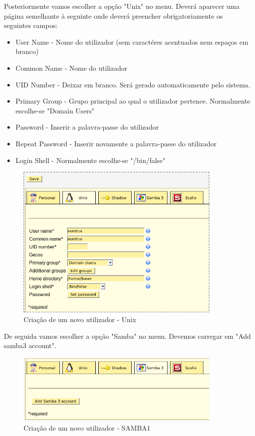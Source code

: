 Posteriormente vamos escolher a opção "Unix" no menu. Deverá aparecer uma página semelhante à seguinte onde deverá preencher obrigatoriamente os seguintes campos:

\begin{itemize}
\item User Name - Nome do utilizador (sem caractéres acentuados nem espaços em branco)
\item Common Name - Nome do utilizador
\item UID Number - Deixar em branco. Será gerado automaticamente pelo sistema.
\item Primary Group - Grupo principal ao qual o utilizador pertence. Normalmente escolhe-se "Domain Users"
\item Password - Inserir a palavra-passe do utilizador
\item Repeat Password - Inserir novamente a palavra-passe do utilizador
\item Login Shell - Normalmente escolhe-se "/bin/false"
\end{itemize}

\begin{figure}[H]
    \begin{center}
        \includegraphics[width=10cm]{include/img/lam10}
    \end{center}
    \caption{Criação de um novo utilizador - Unix}
    \label{fig:LAM10}
\end{figure}

De seguida vamos escolher a opção "Samba" no menu. Devemos carregar em "Add samba3 account".

\begin{figure}[H]
    \begin{center}
        \includegraphics[width=10cm]{include/img/lam9}
    \end{center}
    \caption{Criação de um novo utilizador - SAMBA1}
    \label{fig:LAM9}
\end{figure}



